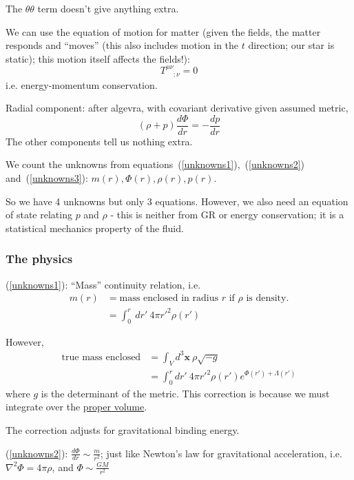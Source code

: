 \documentclass[a4paper]{article} %
\newcommand{\vect}[1]{\mathbf{#1}} %
\newcommand{\ph}[1]{\phantom{#1}}
\begin{document}
The $\theta\theta$ term doesn't give anything extra.

We can use the equation of motion for matter (given the fields, the matter responds and ``moves'' (this also includes motion in the $t$ direction; our star is static); this motion itself affects the fields!):
\begin{equation}
T^{\mu\nu}_{\ph{\mu\nu};\nu}=0
\end{equation}
i.e. energy-momentum conservation.

Radial component: after algevra, with covariant derivative given assumed metric,
\begin{equation}
(\rho+p)\frac{d\Phi}{dr}=-\frac{dp}{dr}\label{unknowns3}
\end{equation}
The other components tell us nothing extra.

We count the unknowns from equations~(\ref{unknowns1}),~(\ref{unknowns2}) and~(\ref{unknowns3}): $m(r),\Phi(r),\rho(r),p(r)$.

So we have 4 unknowns but only 3 equations. However, we also need an equation of state relating $p$ and $\rho$ - this is neither from GR or energy conservation; it is a statistical mechanics property of the fluid.

\subsubsection{The physics}

(\ref{unknowns1}): ``Mass'' continuity relation, i.e. 
\begin{align}
m(r)&=\text{mass enclosed in radius $r$ if $\rho$ is density.}\\
&=\int^r_0~dr'~4\pi r'^2\rho(r')
\end{align}

However,  
\begin{align}
\text{true mass enclosed} &=\int_V d^3\vect{x}~\rho\sqrt{-g}\\
&=\int^r_0 dr'~4\pi r'^2 \rho(r') e^{\Phi(r')+\Lambda(r')} 
\end{align}
where $g$ is the determinant of the metric. This correction is because we must integrate over the \underline{proper volume}.

The correction adjusts for gravitational binding energy.

\HRule

(\ref{unknowns2}): $\frac{d\Phi}{dr}\sim \frac{m}{r^2}$; just like Newton's law for gravitational acceleration, i.e. $\nabla^2 \Phi = 4\pi \rho$, and $\Phi\sim\frac{GM}{r^2}$
\end{document}

